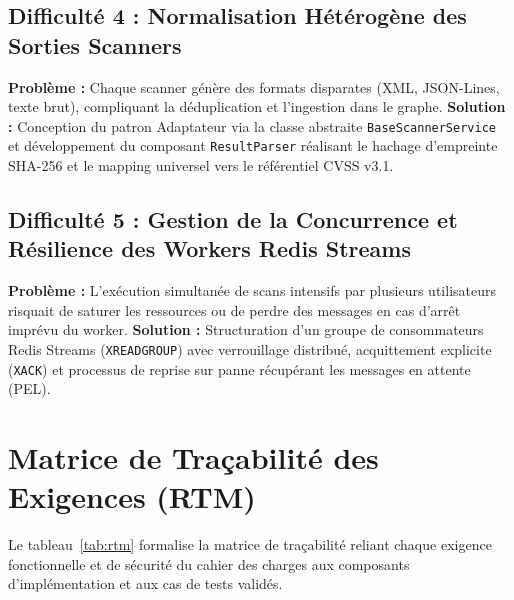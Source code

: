 \subsection{Difficult\'e 4 : Normalisation H\'et\'erog\`ene des Sorties Scanners}
\par \textbf{Probl\`eme :} Chaque scanner g\'en\`ere des formats disparates (XML, JSON-Lines, texte brut), compliquant la d\'eduplication et l'ingestion dans le graphe. \newline
\textbf{Solution :} Conception du patron Adaptateur via la classe abstraite \texttt{BaseScannerService} et d\'eveloppement du composant \texttt{ResultParser} r\'ealisant le hachage d'empreinte SHA-256 et le mapping universel vers le r\'ef\'erentiel CVSS v3.1.

\subsection{Difficult\'e 5 : Gestion de la Concurrence et R\'esilience des Workers Redis Streams}
\par \textbf{Probl\`eme :} L'ex\'ecution simultan\'ee de scans intensifs par plusieurs utilisateurs risquait de saturer les ressources ou de perdre des messages en cas d'arr\^et impr\'evu du worker. \newline
\textbf{Solution :} Structuration d'un groupe de consommateurs Redis Streams (\texttt{XREADGROUP}) avec verrouillage distribu\'e, acquittement explicite (\texttt{XACK}) et processus de reprise sur panne r\'ecup\'erant les messages en attente (PEL).

\section{Matrice de Tra\c{c}abilit\'e des Exigences (RTM)}
\par Le tableau~\ref{tab:rtm} formalise la matrice de tra\c{c}abilit\'e reliant chaque exigence fonctionnelle et de s\'ecurit\'e du cahier des charges aux composants d'impl\'ementation et aux cas de tests valid\'es.


